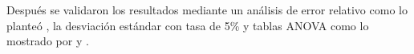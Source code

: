 

Después se validaron los resultados mediante un análisis de error relativo como lo planteó \textcite{valverdedesenvolvimento}, la desviación estándar con tasa de 5\% y tablas ANOVA como lo mostrado por \textcite{NI20171274} y \textcite{PETROLLESE2020113307}.



